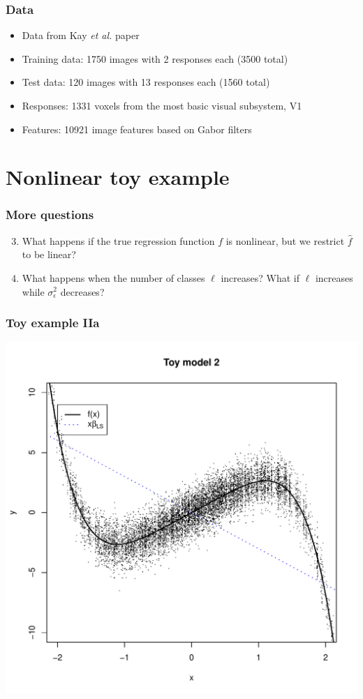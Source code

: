 \documentclass{beamer}
\begin{document}
\begin{frame}
\frametitle{Data}
\begin{itemize}
\item Data from Kay \emph{et al.} paper
\item Training data: 1750 images with 2 responses each (3500 total)
\item Test data: 120 images with 13 responses each (1560 total)
\item Responses: 1331 voxels from the most basic visual subsystem, V1
\item Features: 10921 image features based on Gabor filters
\end{itemize}
\end{frame}

\section{Nonlinear toy example}
\frame{\sectionpage}

\begin{frame}
\frametitle{More questions}
\begin{enumerate}
\setcounter{enumi}{2}
\item
What happens if the true regression function $f$ is nonlinear,
but we restrict $\hat{f}$ to be linear?
\item
What happens when the number of classes $\ell$ increases?
What if $\ell$ increases while $\sigma^2_\epsilon$ decreases?
\end{enumerate}
\end{frame}

\begin{frame}
\frametitle{Toy example IIa}
\begin{center}
\includegraphics[scale = 0.4]{toy3a_plot.pdf}
\end{center}
\end{frame}
\end{document}
